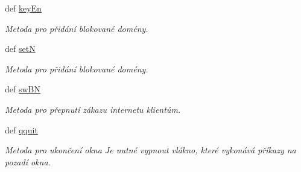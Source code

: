 \begin{DoxyCompactItemize}
def \hyperlink{classmnEnDis_1_1App_adf3a656d9cbec9df505eb8fabb88627e}{key\-En}
\begin{DoxyCompactList}\small\item\em Metoda pro přidání blokované domény. \end{DoxyCompactList}\item 
def \hyperlink{classmnEnDis_1_1App_a23f27d69c398a8b23d2b49556dc29d1b}{set\-N}
\begin{DoxyCompactList}\small\item\em Metoda pro přidání blokované domény. \end{DoxyCompactList}\item 
def \hyperlink{classmnEnDis_1_1App_a0dec9c73d259d0826a1bf2fea42358db}{sw\-B\-N}
\begin{DoxyCompactList}\small\item\em Metoda pro přepnutí zákazu internetu klientům. \end{DoxyCompactList}\item 
def \hyperlink{classmnEnDis_1_1App_affc24d80e2923473251a5321f50e11fb}{qquit}
\begin{DoxyCompactList}\small\item\em Metoda pro ukončení okna Je nutné vypnout vlákno, které vykonává příkazy na pozadí okna. \end{DoxyCompactList}\end{DoxyCompactItemize}
